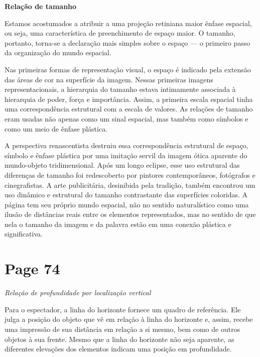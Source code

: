 \documentclass[a4paper]{article}
\begin{document}
\textbf{Relação de tamanho}

Estamos acostumados a atribuir a uma projeção retiniana maior ênfase espacial, ou seja, uma característica de preenchimento de espaço maior. O tamanho, portanto, torna-se a declaração mais simples sobre o espaço --- o primeiro passo da organização do mundo espacial.

Nas primeiras formas de representação visual, o espaço é indicado pela extensão das áreas de cor na superfície da imagem. Nessas primeiras imagens representacionais, a hierarquia do tamanho estava intimamente associada à hierarquia de poder, força e importância. Assim, a primeira escala espacial tinha uma correspondência estrutural com a escala de valores. As relações de tamanho eram usadas não apenas como um sinal espacial, mas também como símbolos e como um meio de ênfase plástica.

A perspectiva renascentista destruiu essa correspondência estrutural de espaço, símbolo e ênfase plástica por uma imitação servil da imagem ótica aparente do mundo-objeto tridimensional. Após um longo eclipse, esse uso estrutural das diferenças de tamanho foi redescoberto por pintores contemporâneos, fotógrafos e cinegrafistas. A arte publicitária, desinibida pela tradição, também encontrou um uso dinâmico e estrutural do tamanho contrastante das superfícies coloridas. A página tem seu próprio mundo espacial, não no sentido naturalístico como uma ilusão de distâncias reais entre os elementos representados, mas no sentido de que nela o tamanho da imagem e da palavra estão em uma conexão plástica e significativa.

\vfill %

\newpage
\section*{Page 74}

\begin{center}
\textit{Relação de profundidade por localização vertical}
\end{center}

Para o espectador, a linha do horizonte fornece um quadro de referência. Ele julga a posição do objeto que vê em relação à linha do horizonte e, assim, recebe uma impressão de sua distância em relação a si mesmo, bem como de outros objetos à sua frente. Mesmo que a linha do horizonte não seja aparente, as diferentes elevações dos elementos indicam uma posição em profundidade.
\end{document}
